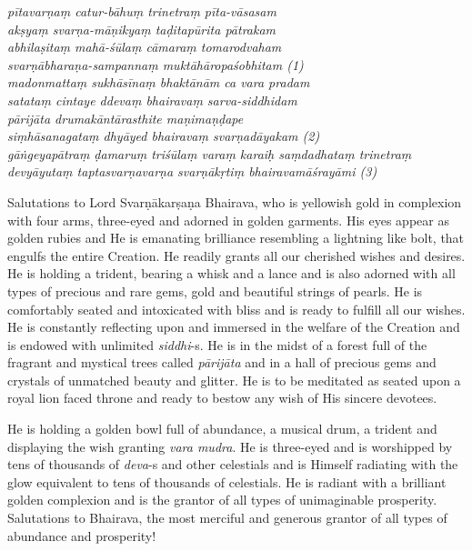 \documentclass[12pt,oneside,a4paper]{article}
\newenvironment{shloka}[1]
  {\bigskip\center#1\varwidth{\linewidth}}
  {\endvarwidth\endcenter\bigskip}
\newcommand{\tl}[1]{\emph{#1}}
\begin{document}
\begin{shloka}\itshape
pītavarṇaṃ catur-bāhuṃ trinetraṃ pīta-vāsasam\\
akṣyaṃ svarṇa-māṇikyaṃ taḍitapūrita pātrakam\\
abhilaṣitaṃ mahā-śūlaṃ cāmaraṃ tomarodvaham\\
svarṇābharaṇa-sampannaṃ muktāhāropaśobhitam (1)\\

madonmattaṃ sukhāsīnaṃ bhaktānām ca vara pradam\\
satataṃ cintaye ddevaṃ bhairavaṃ sarva-siddhidam\\
pārijāta drumakāntārasthite maṇimaṇḍape\\
siṃhāsanagataṃ dhyāyed bhairavaṃ svarṇadāyakam (2)\\

gāṅgeyapātraṃ ḍamaruṃ triśūlaṃ varaṃ karaiḥ saṃdadhataṃ trinetraṃ\\
devyāyutaṃ taptasvarṇavarṇa svarṇākṛtiṃ bhairavamāśrayāmi (3)
\end{shloka}

Salutations to Lord Svarṇākarṣaṇa Bhairava, who is yellowish gold in complexion
with four arms, three-eyed and adorned in golden garments. His eyes appear as
golden rubies and He is emanating brilliance resembling a lightning like bolt,
that engulfs the entire Creation. He readily grants all our cherished wishes
and desires. He is holding a trident, bearing a whisk and a lance and is also
adorned with all types of precious and rare gems, gold and beautiful strings of
pearls. He is comfortably seated and intoxicated with bliss and is ready to
fulfill all our wishes. He is constantly reflecting upon and immersed in
the welfare of the Creation and is endowed with unlimited \tl{siddhi}-s. He is
in the midst of a forest full of the fragrant and mystical trees called
\tl{pārijāta} and in a hall of precious gems and crystals of unmatched beauty
and glitter. He is to be meditated as seated upon a royal lion faced throne and
ready to bestow any wish of His sincere devotees.

He is holding a golden bowl full of abundance, a musical drum, a trident and
displaying the wish granting \tl{vara mudra}. He is three-eyed and is worshipped
by tens of thousands of \tl{deva}-s and other celestials and is Himself
radiating with the glow equivalent to tens of thousands of celestials. He is
radiant with a brilliant golden complexion and is the grantor of all types of
unimaginable prosperity. Salutations to Bhairava, the most merciful and generous
grantor of all types of abundance and prosperity!
\end{document}
